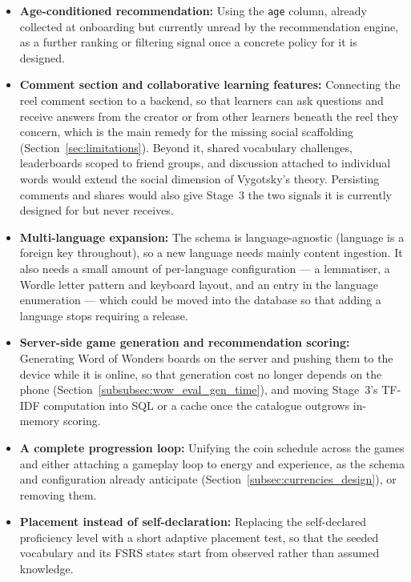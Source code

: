\begin{sloppypar}
\begin{itemize}
        \item \textbf{Age-conditioned recommendation:} Using the \texttt{age} column, already collected at onboarding but currently unread by the recommendation engine, as a further ranking or filtering signal once a concrete policy for it is designed.
        \item \textbf{Comment section and collaborative learning features:} Connecting the reel comment section to a backend, so that learners can ask questions and receive answers from the creator or from other learners beneath the reel they concern, which is the main remedy for the missing social scaffolding (Section~\ref{sec:limitations}). Beyond it, shared vocabulary challenges, leaderboards scoped to friend groups, and discussion attached to individual words would extend the social dimension of Vygotsky's theory. Persisting comments and shares would also give Stage~3 the two signals it is currently designed for but never receives.
        \item \textbf{Multi-language expansion:} The schema is language-agnostic (language is a foreign key throughout), so a new language needs mainly content ingestion. It also needs a small amount of per-language configuration --- a lemmatiser, a Wordle letter pattern and keyboard layout, and an entry in the language enumeration --- which could be moved into the database so that adding a language stops requiring a release.
        \item \textbf{Server-side game generation and recommendation scoring:} Generating Word of Wonders boards on the server and pushing them to the device while it is online, so that generation cost no longer depends on the phone (Section~\ref{subsubsec:wow_eval_gen_time}), and moving Stage~3's TF-IDF computation into SQL or a cache once the catalogue outgrows in-memory scoring.
        \item \textbf{A complete progression loop:} Unifying the coin schedule across the games and either attaching a gameplay loop to energy and experience, as the schema and configuration already anticipate (Section~\ref{subsec:currencies_design}), or removing them.
        \item \textbf{Placement instead of self-declaration:} Replacing the self-declared proficiency level with a short adaptive placement test, so that the seeded vocabulary and its FSRS states start from observed rather than assumed knowledge.

\end{itemize}
\end{sloppypar}
